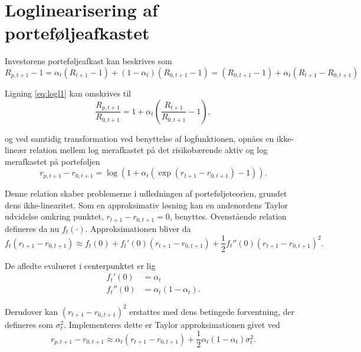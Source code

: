 \documentclass[
  a4paper,
  oneside]{memoir}
\begin{document}
\hypertarget{loglinearisering-af-portefuxf8ljeafkastet}{%
\section{Loglinearisering af porteføljeafkastet}\label{loglinearisering-af-portefuxf8ljeafkastet}}

Investorens porteføljeafkast kan beskrives som
\begin{equation}
R_{p,t+1}-1 = \alpha_t(R_{t+1}- 1) + (1-\alpha_t)(R_{0,t+1}-1)=(R_{0,t+1} -1) + \alpha_t (R_{t+1} - R_{0,t+1}) \label{eq:logl1}
\end{equation}

Ligning \eqref{eq:logl1} kan omskrives til
\begin{equation}
\frac{R_{p,t+1}}{R_{0,t+1}} = 1 + \alpha_t (\frac{R_{t+1}}{R_{0,t+1}}-1), \label{eq:logl2}
\end{equation}

og ved samtidig transformation ved benyttelse af logfunktionen, opnåes en ikke-lineær relation mellem log merafkastet på det risikobærende aktiv og log merafkastet på porteføljen
\begin{equation}
r_{p,t+1} - r_{0,t+1} = \log (1+\alpha_t (\exp(r_{t+1}-r_{0,t+1})-1)). \label{eq:logl3}
\end{equation}

Denne relation skaber problemerne i udledningen af porteføljeteorien, grundet dens ikke-linearitet. Som en approksimativ løsning kan en andenordens Taylor udvidelse omkring punktet, \(r_{t+1}-r_{0,t+1}=0\), benyttes. Ovenstående relation defineres da nu \(f_t(\cdot)\). Approksimationen bliver da
\begin{equation}
f_t(r_{t+1}-r_{0,t+1})\approx f_t(0) + f_t'(0)(r_{t+1}-r_{0,t+1})+\frac{1}{2}f_t''(0)(r_{t+1}-r_{0,t+1})^2. \label{eq:logl4}
\end{equation}

De afledte evalueret i centerpunktet er lig
\begin{align*}
f_t'(0) &= \alpha_t\\
f_t''(0) &= \alpha_t(1-\alpha_t).
\end{align*}

Derudover kan \((r_{t+1}-r_{0,t+1})^2\) erstattes med dens betingede forventning, der defineres som \(\sigma_t^2\). Implementeres dette er Taylor approksimationen givet ved
\begin{equation}
r_{p,t+1} - r_{0,t+1} \approx \alpha_t(r_{t+1} - r_{0,t+1}) + \frac{1}{2} \alpha_t(1-\alpha_t)\sigma_t^2. \label{eq:logl5}
\end{equation}
\end{document}

